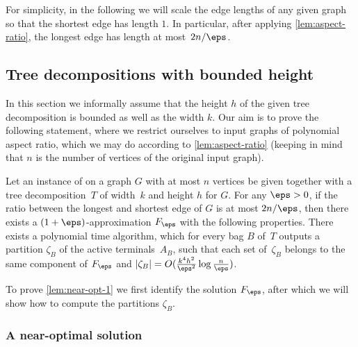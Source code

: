 For simplicity, in the following we will scale the edge lengths of any given graph so that the shortest edge has length $1$.
In particular, after applying \autoref{lem:aspect-ratio}, the longest edge has length at most~$2n/\eps$.

\subsection{Tree decompositions with bounded height}\label{sec:tw-height}

In this section we informally assume that the height $h$ of the given tree
decomposition is bounded as well as the width $k$. 
%
Our aim is to prove the following statement, where we restrict ourselves to input graphs of polynomial aspect ratio, which we may do according to \autoref{lem:aspect-ratio} (keeping in mind that $n$ is the number of vertices of the original input graph).

\begin{lemma}\label{lem:near-opt-1} 
Let an instance of \SF on a graph $G$ with at most $n$ vertices 
be given together with a tree decomposition~$T$ of
width~$k$ and height $h$ for $G$. For any $\eps>0$, if the ratio between the
longest and shortest edge of $G$ is at most $2n/\eps$, then there exists a
$(1+\eps)$-approximation $F_\eps$ with the following properties. There exists a
polynomial time algorithm, which for every bag $B$ of~$T$ outputs a partition
$\zeta_B$ of the active terminals~$A_B$, such that each set of~$\zeta_B$
belongs to the same component of $F_\eps$ and
$|\zeta_B|=O(\frac{k^4h^2}{\eps^2}\log\frac{n}{\eps})$.  
\end{lemma}

%
%

To prove \autoref{lem:near-opt-1} we first identify the solution $F_\eps$, after which we will show how to compute the partitions $\zeta_B$.

\subsubsection{A near-optimal solution}

